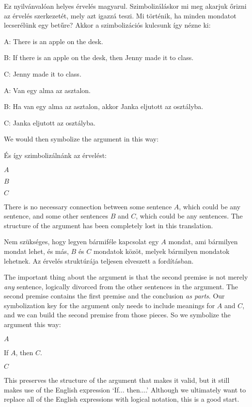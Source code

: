 Ez nyilvánvalóan helyes érvelés magyarul. Szimbolizáláskor mi meg akarjuk őrizni az érvelés szerkezetét, mely azt igazzá teszi. Mi történik, ha minden mondatot lecserélünk egy betűre? Akkor a szimbolizációs kulcsunk így nézne ki:
\begin{ekey}
\item[A:]There is an apple on the desk.
\item[B:]If there is an apple on the desk, then Jenny made it to class.
\item[C:]Jenny made it to class.
\end{ekey}
\begin{ekey}
\item[A:]Van egy alma az asztalon.
\item[B:]Ha van egy alma az asztalon, akkor Janka eljutott az osztályba.
\item[C:]Janka eljutott az osztályba.
\end{ekey}
We would then symbolize the argument in this way:

És így szimbolizálnánk az érvelést:
\begin{earg}
\item[] $A$
\item[] $B$
\item[\therefore] $C$
\end{earg}

There is no necessary connection between some sentence $A$, which could be any sentence, and some other sentences $B$ and $C$, which could be any sentences.
The structure of the argument has been completely lost in this translation.

Nem szükséges, hogy legyen bármiféle kapcsolat egy $A$ mondat, ami bármilyen mondat lehet, és más, $B$ és $C$ mondatok közöt, melyek bármilyen mondatok lehetnek.
Az érvelés struktúrája teljesen elveszett a fordításban.

The important thing about the argument is that the second premise is not merely \emph{any} sentence, logically divorced from the other sentences in the argument. The second premise contains the first premise and the conclusion \emph{as parts}. Our symbolization key for the argument only needs to include meanings for $A$ and $C$, and we can build the second premise from those pieces. So we symbolize the argument this way:
\begin{earg}
\item[] $A$
\item[] If $A$, then $C$.
\item[\therefore] $C$
\end{earg}
This preserves the structure of the argument that makes it valid, but it still makes use of the English expression `If$\ldots$ then$\ldots$.' Although we ultimately want to replace all of the English expressions with logical notation, this is a good start.


